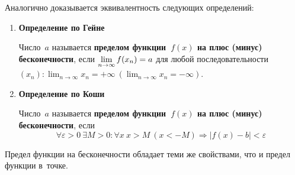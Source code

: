 Аналогично доказывается эквивалентность следующих определений:
\begin{enumerate}
	\item \textbf{Определение по Гейне}
	
	Число~$a$ называется \textbf{пределом функции~$f(x)$ на плюс (минус) бесконечности}, если \allowbreak
	$\displaystyle \lim_{n \to \infty} f(x_n) \opbr= a$ для любой последовательности~$\displaystyle (x_n): \lim_{n \to \infty} x_n = +\infty \ (\lim_{n \to \infty} x_n = -\infty)$.
	
	\item \textbf{Определение по Коши}
	
	Число~$a$ называется \textbf{пределом функции~$f(x)$ на плюс (минус) бесконечности}, если
	\begin{equation*}
	\forall \varepsilon > 0 \ \exists M > 0 \colon \forall x \ x > M \ (x < -M) \Rightarrow |f(x) - b| < \varepsilon
	\end{equation*}
\end{enumerate}

Предел функции на бесконечности обладает теми же свойствами, что и предел функции в~точке.